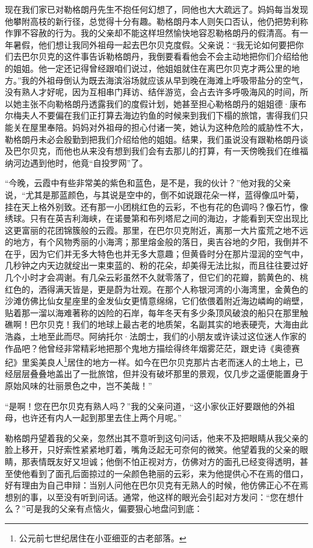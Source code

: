 \par 现在我们家已对勒格朗丹先生不抱任何幻想了，同他也大大疏远了。妈妈每当发现他攀附高枝的新行径，总觉得十分有趣。勒格朗丹本人则矢口否认，他仍把势利称作罪不容赦的行为。我的父亲却不能这样坦然愉快地容忍勒格朗丹的假清高。有一年暑假，他们想让我同外祖母一起去巴尔贝克度假。父亲说：“我无论如何要把你们去巴尔贝克的这件事告诉勒格朗丹，我倒要看看他会不会主动地把你们介绍给他的姐姐。他一定还记得曾经跟咱们说过，他姐姐就住在离巴尔贝克才两公里的地方。”我的外祖母倒认为既去海滨浴场就应该从早到晚在海滩上呼吸带盐分的空气，没有熟人才好呢，因为互相串门拜访、结伴游览，会占去许多呼吸海风的时间，所以她主张不向勒格朗丹透露我们的度假计划，她甚至担心勒格朗丹的姐姐德·康布尔梅夫人不要偏在我们正打算去海边钓鱼的时候来到我们下榻的旅馆，害得我们只能关在屋里奉陪。妈妈对外祖母的担心付诸一笑，她认为这种危险的威胁性不大，勒格朗丹未必会殷勤到把我们介绍给他的姐姐。结果，我们虽说没有跟勒格朗丹谈及巴尔贝克，而他也从来没有想到我们会有去那儿的打算，有一天傍晚我们在维福纳河边遇到他时，他竟“自投罗网”了。
\par “今晚，云霞中有些非常美的紫色和蓝色，是不是，我的伙计？”他对我的父亲说，“尤其是那蓝颜色，与其说是空中的，倒不如说跟花朵一样，蓝得像瓜叶菊，挂在天上格外别致。还有那一小团桃红色的云彩，不也有花的色调吗？像石竹，像绣球。只有在英吉利海峡，在诺曼第和布列塔尼之间的海边，才能看到天空出现比这更富丽的花团锦簇般的云霞。那里，在巴尔贝克附近，离那一大片蛮荒之地不远的地方，有个风物秀丽的小海湾；那里熔金般的落日，奥吉谷地的夕阳，我倒并不在乎，因为它们并无多大特色也并无多大意趣；但黄昏时分在那片湿润的空气中，几秒钟之内天边就绽出一束束蓝的、粉的花朵，却美得无法比拟，而且往往要过好几个小时才会凋谢。有几朵云彩虽然不久就零落了，但它们的花瓣，鹅黄色的、桃红色的，洒得满天皆是，更是蔚为壮观。在那个人称银河湾的小海湾里，金黄色的沙滩仿佛比仙女星座里的金发仙女更情意绵绵，它们依偎着附近海边嶙峋的峭壁，贴着那一溜以海难著称的凶险的石岸，每年冬天有多少条顶风破浪的船只在那里触礁啊！巴尔贝克！我们的地球上最古老的地质架，名副其实的地表硬壳，大海由此浩淼，土地至此而尽。阿纳托尔·法朗士，我们的小朋友或许读过这位迷人作家的作品吧？他曾经非常精彩地把那个鬼地方描绘得终年烟雾茫茫，跟史诗《奥德赛纪》里奚美良人\footnote{公元前七世纪居住在小亚细亚的古老部落。}居住的地方一样。如今在巴尔贝克那片古老而迷人的土地上，已经层层叠叠地盖出了一批旅馆，但并没有破坏那里的景观，仅几步之遥便能置身于原始风味的壮丽景色之中，岂不美哉！”
\par “是啊！您在巴尔贝克有熟人吗？”我的父亲问道，“这小家伙正好要跟他的外祖母，也许还有内人一起到那里去住上两个月呢。”
\par 勒格朗丹望着我的父亲，忽然出其不意听到这句问话，他来不及把眼睛从我父亲的脸上移开，只好索性紧紧地盯着，嘴角泛起无可奈何的微笑。他望着我的父亲的眼睛，那表情既友好又坦诚；他倒不怕正视对方，仿佛对方的面孔已经变得透明，甚至使他看到了面孔后面掠过的一朵颜色艳丽的云彩，来为他提供心不在焉的借口，好有理由为自己申辩：当别人问他在巴尔贝克有无熟人的时候，他仿佛正心不在焉想别的事，以至没有听到问话。通常，他这样的眼光会引起对方发问：“您在想什么？”可是我的父亲有点恼火，偏要狠心地盘问到底：
